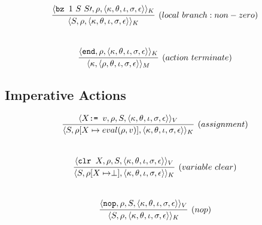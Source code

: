 \documentclass{article}
\newcommand{\state}[1]{\langle #1 \rangle}
\newcommand{\bottom}[0]{\perp}
\begin{document}
\[
  \infer[(local\ branch: non-zero)]{\state{S, \rho, \state{\kappa, \theta, \iota, \sigma, \epsilon}}_K}{\state{\texttt{bz }1\ S\ S\prime, \rho, \state{\kappa, \theta, \iota, \sigma, \epsilon}}_K}
\]
\\

\[
  \infer[(action\ terminate)]{\state{\kappa, \state{\rho, \theta, \iota, \sigma, \epsilon}}_M}{\state{\texttt{end}, \rho, \state{\kappa, \theta, \iota, \sigma, \epsilon}}_K}
\]

\subsection{Imperative Actions}


\[
  \infer[(assignment)]{\state{S, \rho[X \mapsto eval(\rho, v)], \state{\kappa, \theta, \iota, \sigma, \epsilon}}_K}{\state{X \texttt{:= } v, \rho, S, \state{\kappa, \theta, \iota, \sigma, \epsilon}}_V}
\]
\\



\[
  \infer[(variable\ clear)]{\state{S, \rho[X \mapsto \bottom], \state{\kappa, \theta, \iota, \sigma, \epsilon}}_K}{\state{\texttt{clr } X, \rho, S, \state{\kappa, \theta, \iota, \sigma, \epsilon}}_V}
\]
\\


\[
  \infer[(nop)]{\state{S, \rho, \state{\kappa, \theta, \iota, \sigma, \epsilon}}_K}{\state{\texttt{nop}, \rho, S, \state{\kappa, \theta, \iota, \sigma, \epsilon}}_V}
\]




%
%
\end{document}
